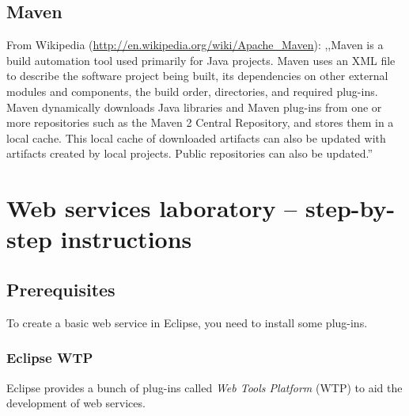 \documentclass[]{report}
\begin{document}
\section{Maven}

From Wikipedia (\url{http://en.wikipedia.org/wiki/Apache_Maven}):
,,Maven is a build automation tool used primarily for Java projects.
Maven uses an XML file to describe the software project being built, its
dependencies on other external modules and components, the build order,
directories, and required plug-ins. Maven dynamically downloads Java
libraries and Maven plug-ins from one or more repositories such as the
Maven 2 Central Repository, and stores them in a local cache. This local
cache of downloaded artifacts can also be updated with artifacts created
by local projects. Public repositories can also be updated.''

\chapter{Web services laboratory -- step-by-step instructions}

\section{Prerequisites}

To create a basic web service in Eclipse, you need to install some
plug-ins.

\subsection{Eclipse WTP}

Eclipse provides a bunch of plug-ins called \emph{Web Tools Platform}
(WTP) to aid the development of web services.
\end{document}

